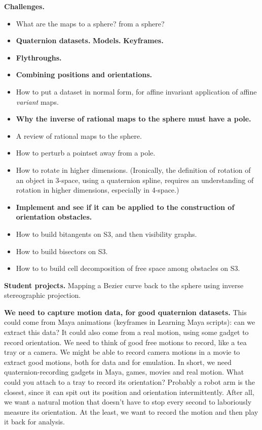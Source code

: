 \documentclass[12pt]{article}
\begin{document}
{\bf Challenges.}
\begin{itemize}
\item  What are the maps to a sphere? from a sphere?
\item  {\bf Quaternion datasets.}  {\bf Models.} {\bf Keyframes.}
\item  {\bf Flythroughs.}
\item  {\bf Combining positions and orientations.}
\item 
How to put a dataset in normal form, for affine invariant application of 
affine {\em variant} maps.
\item
{\bf Why the inverse of rational maps to the sphere must have a pole.}
\item
A review of rational maps to the sphere. 
\item
How to perturb a pointset away from a pole.
\item
How to rotate in higher dimensions.
(Ironically, the definition of rotation of an object in 3-space,
using a quaternion spline, requires an understanding of rotation in higher dimensions,
especially in 4-space.)
\item
{\bf Implement and see if it can be applied to the construction of orientation obstacles.}
\item
How to build bitangents on S3, and then visibility graphs.
\item
How to build bisectors on S3. 
\item
How to to build cell decomposition of free space among obstacles on S3.
\end{itemize}

{\bf Student projects.}
Mapping a Bezier curve back to the sphere using inverse stereographic projection.

{\bf We need to capture motion data, for good quaternion datasets.}
This could come from Maya animations (keyframes in Learning Maya scripts):
can we extract this data?
It could also come from a real motion, using some gadget to record orientation.
We need to think of good free motions to record, like a tea tray or a camera.
We might be able to record camera motions in a movie to extract good motions,
both for data and for emulation.
In short, we need quaternion-recording gadgets in Maya, games, movies and real motion.
What could you attach to a tray to record its orientation?
Probably a robot arm is the closest, since it can spit out its position and orientation
intermittently.
After all, we want a natural motion that doesn't have to stop every second to laboriously
measure its orientation.  
At the least, we want to record the motion and then play it back for analysis.
\end{document}
